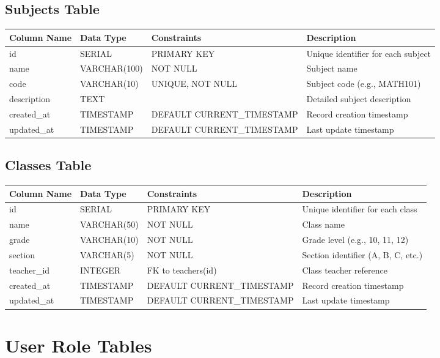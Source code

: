 \documentclass[11pt,a4paper]{article}
\begin{document}
\subsection{Subjects Table}
\begin{longtable}{|p{3.5cm}|p{2.5cm}|p{3cm}|p{5.5cm}|}
\hline
\textbf{Column Name} & \textbf{Data Type} & \textbf{Constraints} & \textbf{Description} \\
\hline
\endhead
id & SERIAL & PRIMARY KEY & Unique identifier for each subject \\
\hline
name & VARCHAR(100) & NOT NULL & Subject name \\
\hline
code & VARCHAR(10) & UNIQUE, NOT NULL & Subject code (e.g., MATH101) \\
\hline
description & TEXT & & Detailed subject description \\
\hline
created\_at & TIMESTAMP & DEFAULT CURRENT\_TIMESTAMP & Record creation timestamp \\
\hline
updated\_at & TIMESTAMP & DEFAULT CURRENT\_TIMESTAMP & Last update timestamp \\
\hline
\end{longtable}

\subsection{Classes Table}
\begin{longtable}{|p{3.5cm}|p{2.5cm}|p{3cm}|p{5.5cm}|}
\hline
\textbf{Column Name} & \textbf{Data Type} & \textbf{Constraints} & \textbf{Description} \\
\hline
\endhead
id & SERIAL & PRIMARY KEY & Unique identifier for each class \\
\hline
name & VARCHAR(50) & NOT NULL & Class name \\
\hline
grade & VARCHAR(10) & NOT NULL & Grade level (e.g., 10, 11, 12) \\
\hline
section & VARCHAR(5) & NOT NULL & Section identifier (A, B, C, etc.) \\
\hline
teacher\_id & INTEGER & FK to teachers(id) & Class teacher reference \\
\hline
created\_at & TIMESTAMP & DEFAULT CURRENT\_TIMESTAMP & Record creation timestamp \\
\hline
updated\_at & TIMESTAMP & DEFAULT CURRENT\_TIMESTAMP & Last update timestamp \\
\hline
\end{longtable}

\section{User Role Tables}
\end{document}
